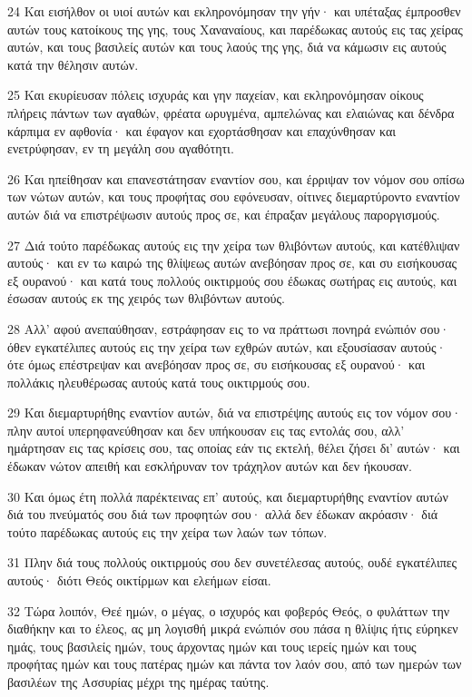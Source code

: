 \par 24 Και εισήλθον οι υιοί αυτών και εκληρονόμησαν την γήν· και υπέταξας έμπροσθεν αυτών τους κατοίκους της γης, τους Χαναναίους, και παρέδωκας αυτούς εις τας χείρας αυτών, και τους βασιλείς αυτών και τους λαούς της γης, διά να κάμωσιν εις αυτούς κατά την θέλησιν αυτών.
\par 25 Και εκυρίευσαν πόλεις ισχυράς και γην παχείαν, και εκληρονόμησαν οίκους πλήρεις πάντων των αγαθών, φρέατα ωρυγμένα, αμπελώνας και ελαιώνας και δένδρα κάρπιμα εν αφθονία· και έφαγον και εχορτάσθησαν και επαχύνθησαν και ενετρύφησαν, εν τη μεγάλη σου αγαθότητι.
\par 26 Και ηπείθησαν και επανεστάτησαν εναντίον σου, και έρριψαν τον νόμον σου οπίσω των νώτων αυτών, και τους προφήτας σου εφόνευσαν, οίτινες διεμαρτύροντο εναντίον αυτών διά να επιστρέψωσιν αυτούς προς σε, και έπραξαν μεγάλους παροργισμούς.
\par 27 Διά τούτο παρέδωκας αυτούς εις την χείρα των θλιβόντων αυτούς, και κατέθλιψαν αυτούς· και εν τω καιρώ της θλίψεως αυτών ανεβόησαν προς σε, και συ εισήκουσας εξ ουρανού· και κατά τους πολλούς οικτιρμούς σου έδωκας σωτήρας εις αυτούς, και έσωσαν αυτούς εκ της χειρός των θλιβόντων αυτούς.
\par 28 Αλλ' αφού ανεπαύθησαν, εστράφησαν εις το να πράττωσι πονηρά ενώπιόν σου· όθεν εγκατέλιπες αυτούς εις την χείρα των εχθρών αυτών, και εξουσίασαν αυτούς· ότε όμως επέστρεψαν και ανεβόησαν προς σε, συ εισήκουσας εξ ουρανού· και πολλάκις ηλευθέρωσας αυτούς κατά τους οικτιρμούς σου.
\par 29 Και διεμαρτυρήθης εναντίον αυτών, διά να επιστρέψης αυτούς εις τον νόμον σου· πλην αυτοί υπερηφανεύθησαν και δεν υπήκουσαν εις τας εντολάς σου, αλλ' ημάρτησαν εις τας κρίσεις σου, τας οποίας εάν τις εκτελή, θέλει ζήσει δι' αυτών· και έδωκαν νώτον απειθή και εσκλήρυναν τον τράχηλον αυτών και δεν ήκουσαν.
\par 30 Και όμως έτη πολλά παρέκτεινας επ' αυτούς, και διεμαρτυρήθης εναντίον αυτών διά του πνεύματός σου διά των προφητών σου· αλλά δεν έδωκαν ακρόασιν· διά τούτο παρέδωκας αυτούς εις την χείρα των λαών των τόπων.
\par 31 Πλην διά τους πολλούς οικτιρμούς σου δεν συνετέλεσας αυτούς, ουδέ εγκατέλιπες αυτούς· διότι Θεός οικτίρμων και ελεήμων είσαι.
\par 32 Τώρα λοιπόν, Θεέ ημών, ο μέγας, ο ισχυρός και φοβερός Θεός, ο φυλάττων την διαθήκην και το έλεος, ας μη λογισθή μικρά ενώπιόν σου πάσα η θλίψις ήτις εύρηκεν ημάς, τους βασιλείς ημών, τους άρχοντας ημών και τους ιερείς ημών και τους προφήτας ημών και τους πατέρας ημών και πάντα τον λαόν σου, από των ημερών των βασιλέων της Ασσυρίας μέχρι της ημέρας ταύτης.
